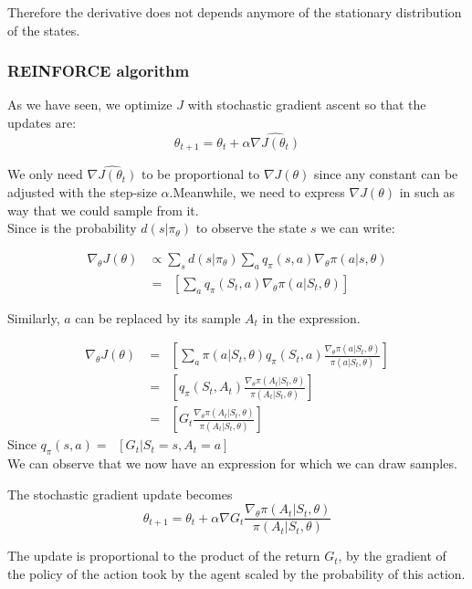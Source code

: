 \documentclass[11pt, onecolumn, a4paper]{report}
\begin{document}
Therefore the derivative does not depends anymore of the stationary distribution of the states.\\




\subsubsection{ REINFORCE algorithm}

As we have seen, we optimize $J$ with stochastic gradient ascent so that the updates are:
$$\theta_{t+1}=\theta_{t}+\alpha \widehat{\nabla J(\theta_t)}$$


We only need $\widehat{\nabla J(\theta_t)}$ to be proportional to $\nabla J(\theta)$ since any constant can be adjusted with the step-size $\alpha$.Meanwhile, we need to express $\nabla J(\theta)$ in such as way that we could sample from it.\\

Since is the probability $d(s|\pi_\theta)$ to observe the state $s$ we can write:

\begin{align}
\nabla_\theta J(\theta) & \propto  \sum_s d(s|\pi_\theta) \sum_a q_\pi(s,a)\nabla_\theta \pi(a|s,\theta) \\ & = \mathop{\mathbb{E_\pi}}[\sum_a q_\pi(S_t,a) \nabla_\theta \pi(a|S_t,\theta)]
\end{align}

Similarly, $a$ can be replaced by its sample $A_t$ in the expression.

\begin{align}
\nabla_\theta J(\theta) & = \mathop{\mathbb{E_\pi}}[\sum_a \pi(a |S_t,\theta) q_\pi(S_t,a)
\frac{\nabla_\theta \pi(a|S_t,\theta)}{\pi(a |S_t,\theta)}]\\ & = \mathop{\mathbb{E_\pi}}[ q_\pi(S_t,A_t)
\frac{\nabla_\theta \pi(A_t|S_t,\theta)}{\pi(A_t |S_t,\theta)}]\\ & = \mathop{\mathbb{E_\pi}}[ G_t \frac{\nabla_\theta \pi(A_t|S_t,\theta)}{\pi(A_t |S_t,\theta)}]
\end{align}
Since $q_\pi(s,a) = \mathop{\mathbb{E_\pi}}[G_t | S_t=s,A_t=a]$\\

We can observe that we now have an expression for which we can draw samples.


The stochastic gradient update becomes
$$\theta_{t+1}=\theta_{t}+\alpha \nabla G_t \frac{\nabla_\theta \pi(A_t|S_t,\theta)}{\pi(A_t |S_t,\theta)}$$

The update is proportional to the product of the return $G_t$, by the gradient of the policy of the action took by the agent scaled by the probability of this action.
\end{document}
